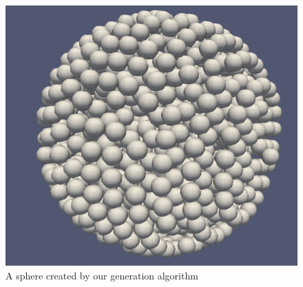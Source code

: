 \documentclass{article}
\begin{document}
\begin{figure}[H]
    \includegraphics[width=\textwidth]{res/sphere}
    \caption{A sphere created by our generation algorithm}
    \label{fig:sphere}
\end{figure}
\end{document}
